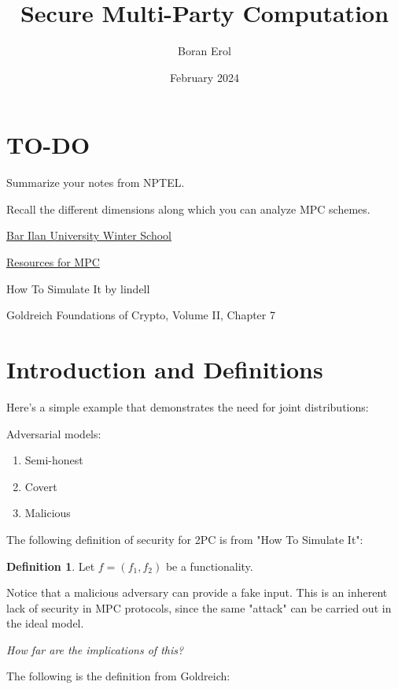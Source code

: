 \documentclass{article}
\title{Secure Multi-Party Computation}
\date{February 2024}
\author{Boran Erol}
\theoremstyle{definition}
\newtheorem{definition}{Definition}
\begin{document}
\maketitle


\section{TO-DO}

Summarize your notes from NPTEL.

Recall the different dimensions along which you can analyze MPC schemes.

\href{https://u.cs.biu.ac.il/~lindell/mpcschool.html}{Bar Ilan University Winter School}

\href{https://u.cs.biu.ac.il/~lindell/MPC-resources.html}{Resources for MPC}

How To Simulate It by lindell

Goldreich Foundations of Crypto, Volume II, Chapter 7

\newpage

\section{Introduction and Definitions}

Here's a simple example that demonstrates the need for joint distributions:

Adversarial models:

\begin{enumerate}
    \item Semi-honest
    \item Covert
    \item Malicious
\end{enumerate}

The following definition of security for 2PC is from "How To Simulate It":

\begin{definition}
    Let $f = (f_{1}, f_{2})$ be a functionality. 
\end{definition}

Notice that a malicious adversary can provide a fake input. This is an inherent
lack of security in MPC protocols, since the same "attack" can be carried out in the ideal model.

\textit{How far are the implications of this?}

The following is the definition from Goldreich:
\end{document}
